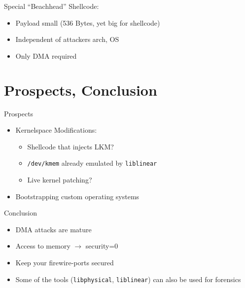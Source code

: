 \documentclass{beamer}
\newenvironment{itemizeframe}[1]
  {\begin{frame}{#1}\startitemizeframe}
  {\stopitemizeframe\end{frame}}
\newcommand\startitemizeframe{\begin{itemize}}
\newcommand\stopitemizeframe{\end{itemize}}
\begin{document}

		\begin{frame}
			Special ``Beachhead'' Shellcode: \\
		\end{frame}
		
		\begin{itemizeframe}{}
			\item Payload small (536 Bytes, yet big for shellcode)
			\item Independent of attackers arch, OS
			\item Only DMA required
		\end{itemizeframe}


\section{Prospects, Conclusion}

	\begin{itemizeframe}{Prospects}
		\item Kernelspace Modifications:
		\begin{itemize} 
			\item Shellcode that injects LKM?
			\item \texttt{/dev/kmem} already emulated by \texttt{liblinear}
			\item Live kernel patching?
		\end{itemize}
		\item Bootstrapping custom operating systems
	\end{itemizeframe}

	\begin{itemizeframe}{Conclusion}
		\item DMA attacks are mature
		\item Access to memory $\rightarrow$ security=0
		\item Keep your firewire-ports secured
		\item Some of the tools (\texttt{libphysical}, \texttt{liblinear}) can also be used for forensics
	\end{itemizeframe}
\end{document}

